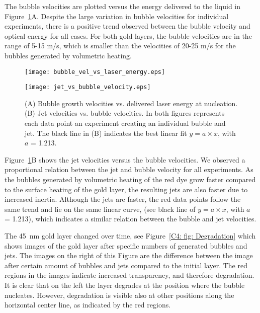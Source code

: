 \documentclass[11pt]{article}
\begin{document}
The bubble velocities are plotted versus the energy delivered to the liquid in Figure~\ref{C4: fig: bubble and jet dynamics}A. Despite the large variation in bubble velocities for individual experiments, there is a positive trend observed between the bubble velocity and optical energy for all cases. For both gold layers, the bubble velocities are in the range of 5-15 m/s, which is smaller than the velocities of 20-25 m/s for the bubbles generated by volumetric heating. 

\begin{figure}[t!]
	\begin{minipage}[t]{0.5\linewidth}
		\centering
		\texttt{[image: bubble\_vel\_vs\_laser\_energy.eps]}
	\end{minipage}
	\begin{minipage}[t]{0.5\linewidth}
		\centering
		\texttt{[image: jet\_vs\_bubble\_velocity.eps]}
	\end{minipage}
	\caption{(A) Bubble growth velocities vs. delivered laser energy at nucleation. (B) Jet velocities vs. bubble velocities. In both figures represents each data point an experiment creating an individual bubble and jet. The black line in (B) indicates the best linear fit $y = a \times x$, with $a$ = 1.213.}
	\label{C4: fig: bubble and jet dynamics}
\end{figure}

Figure~\ref{C4: fig: bubble and jet dynamics}B shows the jet velocities versus the bubble velocities. We observed a proportional relation between the jet and bubble velocity for all experiments. As the bubbles generated by volumetric heating of the red dye grow faster compared to the surface heating of the gold layer, the resulting jets are also faster due to increased inertia. Although the jets are faster, the red data points follow the same trend and lie on the same linear curve, (see black line of $y = a \times x$, with $a$ = 1.213), which indicates a similar relation between the bubble and jet velocities.

The 45~nm gold layer changed over time, see Figure~\ref{C4: fig: Degradation} which shows images of the gold layer after specific numbers of generated bubbles and jets. The images on the right of this Figure are the difference between the image after certain amount of bubbles and jets compared to the initial layer. The red regions in the images indicate increased transparency, and therefore degradation. It is clear that on the left the layer degrades at the position where the bubble nucleates. However, degradation is visible also at other positions along the horizontal center line, as indicated by the red regions. 
\end{document}
